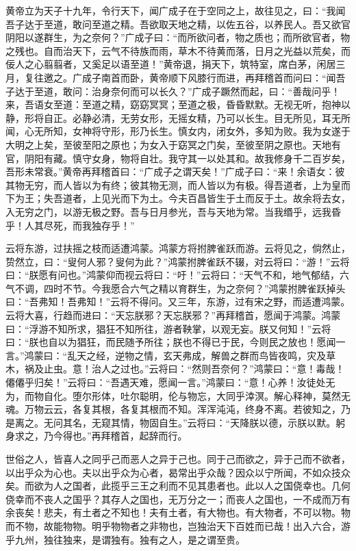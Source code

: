 \documentclass[]{article}
\begin{document}
黄帝立为天子十九年，令行天下，闻广成子在于空同之上，故往见之，曰：``我闻吾子达于至道，敢问至道之精。吾欲取天地之精，以佐五谷，以养民人。吾又欲官阴阳以遂群生，为之奈何？''广成子曰：``而所欲问者，物之质也；而所欲官者，物之残也。自而治天下，云气不待族而雨，草木不待黄而落，日月之光益以荒矣，而佞人之心翦翦者，又奚足以语至道！''黄帝退，捐天下，筑特室，席白茅，闲居三月，复往邀之。广成子南首而卧，黄帝顺下风膝行而进，再拜稽首而问曰：``闻吾子达于至道，敢问：治身奈何而可以长久？''广成子蹶然而起，曰：``善哉问乎！来，吾语女至道：至道之精，窈窈冥冥；至道之极，昏昏默默。无视无听，抱神以静，形将自正。必静必清，无劳女形，无摇女精，乃可以长生。目无所见，耳无所闻，心无所知，女神将守形，形乃长生。慎女内，闭女外，多知为败。我为女遂于大明之上矣，至彼至阳之原也；为女入于窈冥之门矣，至彼至阴之原也。天地有官，阴阳有藏。慎守女身，物将自壮。我守其一以处其和。故我修身千二百岁矣，吾形未常衰。''黄帝再拜稽首曰：``广成子之谓天矣！''广成子曰：``来！余语女：彼其物无穷，而人皆以为有终；彼其物无测，而人皆以为有极。得吾道者，上为皇而下为王；失吾道者，上见光而下为土。今夫百昌皆生于土而反于土。故余将去女，入无穷之门，以游无极之野。吾与日月参光，吾与天地为常。当我缗乎，远我昏乎！人其尽死，而我独存乎！''

云将东游，过扶摇之枝而适遭鸿蒙。鸿蒙方将拊脾雀跃而游。云将见之，倘然止，贽然立，曰：``叟何人邪？叟何为此？''鸿蒙拊脾雀跃不辍，对云将曰：``游！''云将曰：``朕愿有问也。''鸿蒙仰而视云将曰：``吁！''云将曰：``天气不和，地气郁结，六气不调，四时不节。今我愿合六气之精以育群生，为之奈何？''鸿蒙拊脾雀跃掉头曰：``吾弗知！吾弗知！''云将不得问。又三年，东游，过有宋之野，而适遭鸿蒙。云将大喜，行趋而进曰：``天忘朕邪？天忘朕邪？''再拜稽首，愿闻于鸿蒙。鸿蒙曰：``浮游不知所求，猖狂不知所往，游者鞅掌，以观无妄。朕又何知！''云将曰：``朕也自以为猖狂，而民随予所往；朕也不得已于民，今则民之放也！愿闻一言。''鸿蒙曰：``乱天之经，逆物之情，玄天弗成，解兽之群而鸟皆夜鸣，灾及草木，祸及止虫。意！治人之过也。''云将曰：``然则吾奈何？''鸿蒙曰：``意！毒哉！僊僊乎归矣！''云将曰：``吾遇天难，愿闻一言。''鸿蒙曰：``意！心养！汝徒处无为，而物自化。堕尔形体，吐尔聪明，伦与物忘，大同乎涬溟。解心释神，莫然无魂。万物云云，各复其根，各复其根而不知。浑浑沌沌，终身不离。若彼知之，乃是离之。无问其名，无窥其情，物固自生。''云将曰：``天降朕以德，示朕以默。躬身求之，乃今得也。''再拜稽首，起辞而行。

世俗之人，皆喜人之同乎己而恶人之异于己也。同于己而欲之，异于己而不欲者，以出乎众为心也。夫以出乎众为心者，曷常出乎众哉？因众以宁所闻，不如众技众矣。而欲为人之国者，此揽乎三王之利而不见其患者也。此以人之国侥幸也。几何侥幸而不丧人之国乎？其存人之国也，无万分之一；而丧人之国也，一不成而万有余丧矣！悲夫，有土者之不知也！夫有土者，有大物也。有大物者，不可以物。物而不物，故能物物。明乎物物者之非物也，岂独治天下百姓而已哉！出入六合，游乎九州，独往独来，是谓独有。独有之人，是之谓至贵。
\end{document}
